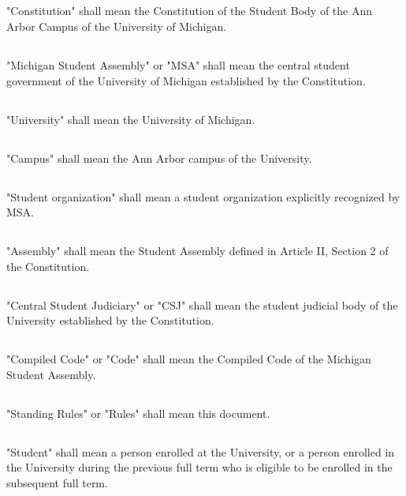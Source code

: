 \documentclass{rules}
\begin{document}
\subsection{}
"Constitution" shall mean the Constitution of the Student Body of the Ann Arbor Campus of the University of Michigan.
\subsection{}
"Michigan Student Assembly" or "MSA" shall mean the central student government of the University of Michigan established by the Constitution.
\subsection{}
"University" shall mean the University of Michigan.
\subsection{}
"Campus" shall mean the Ann Arbor campus of the University.
\subsection{}
"Student organization" shall mean a student organization explicitly recognized by MSA.
\subsection{}
"Assembly" shall mean the Student Assembly defined in Article II, Section 2 of the Constitution.
\subsection{}
"Central Student Judiciary" or "CSJ" shall mean the student judicial body of the University established by the Constitution.
\subsection{}
"Compiled Code" or "Code" shall mean the Compiled Code of the Michigan Student Assembly.
\subsection{}
"Standing Rules" or "Rules" shall mean this document.
\subsection{}
"Student" shall mean a person enrolled at the University, or a person enrolled in the University during the previous full term who is eligible to be enrolled in the subsequent full term.
\end{document}
